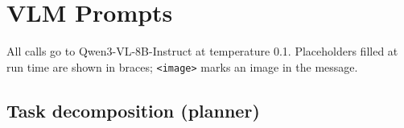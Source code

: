 \chapter{VLM Prompts}
\label{app:prompts}
All calls go to Qwen3-VL-8B-Instruct at temperature 0.1. Placeholders filled at run
time are shown in braces; \texttt{<image>} marks an image in the message.

\section{Task decomposition (planner)}
